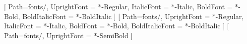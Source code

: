 \setmainfont{Inter}[
  Path=fonts/,
  UprightFont = *-Regular,
  ItalicFont  = *-Italic,
  BoldFont    = *-Bold,
  BoldItalicFont = *-BoldItalic
]
\setsansfont{Inter}[
  Path=fonts/,
  UprightFont = *-Regular,
  ItalicFont  = *-Italic,
  BoldFont    = *-Bold,
  BoldItalicFont = *-BoldItalic
]
\newfontfamily{}[
  Path=fonts/,
  UprightFont = *-SemiBold
]


